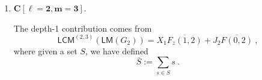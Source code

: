 \documentclass[a4paper,10pt]{article}
\newcommand{\mr}[1]{\mathsf{#1}}
\begin{document}
\begin{appendix}
\begin{enumerate}
From \eqref{eq:Gr\"{o}bner_basis_Gn_app} with $n=1$, the depth-1 constraint is given by
\begin{equation}
    \mr{LCM}^{(1,3)}(\mr{LM}(G_1)) = X_1 Z_0^2~.
\end{equation}
The non-trivial contributions for the depth-2 constraints
are given by 
\begin{equation}
\begin{aligned}
    \mr{LCM}^{(1,3)}(\{X_0 Z_0\}, \{X_0 Z_1\}) &= X_0 Z_0 Z_1~,\\
    \mr{LCM}^{(1,3)}(\{X_0 Z_0\}, \{J_1\}\cdot F(0,1))&= 2 J_1 X_0 Z_0~, \\
    \mr{LCM}^{(1,3)}(\{J_1\}\cdot F(0,1), \{J_1\} \cdot F(0,1)) &= 
    J_1(X_0Y_0+Y_0Z_0+X_0Z_0)~.
\end{aligned}
\end{equation}
Depth-3 contribution are given by
\begin{equation}
    \mr{LCM}^{(1,3)}(\{X_0Z_0\},\{J_1\}\cdot F(0,1), \{J_1\}\cdot F(0,1)) = 
    J_1X_0Z_0~.
\end{equation}
Then we have
\begin{equation}
    C[\ell=1,m=3]=-1+(1+2+3)-1=4~.
\end{equation}
\item $\boldsymbol{C[\ell=2, m = 3].}$

The depth-1 contribution comes from
\begin{equation}
\mr{LCM}^{(2,3)}\left(\mr{L M}\left(G_2\right)\right)=X_1\overline{ F_z(1,2)}+J_2 \overline{F(0,2)}~,
\end{equation}
where given a set $S$, we have defined 
\begin{equation}
    \overline{S}:=\sum_{s\in S}s~.
\end{equation}


\end{enumerate}
\end{appendix}
\end{document}
